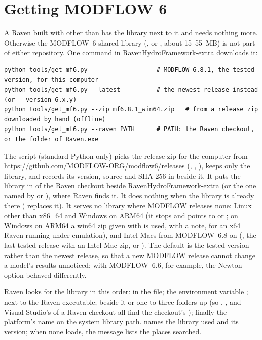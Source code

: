 \section{Getting MODFLOW 6}\label{sec:getmf6}
A Raven built with  other than  has the library next to it and needs nothing more. Otherwise
the MODFLOW~6 shared library (,  or , about 15--55~MB) is not part of
either repository. One command in RavenHydroFramework-extra downloads it:
\begin{lstlisting}
python tools/get_mf6.py                   # MODFLOW 6.8.1, the tested version, for this computer
python tools/get_mf6.py --latest          # the newest release instead (or --version 6.x.y)
python tools/get_mf6.py --zip mf6.8.1_win64.zip   # from a release zip downloaded by hand (offline)
python tools/get_mf6.py --raven PATH      # PATH: the Raven checkout, or the folder of Raven.exe
\end{lstlisting}
The script (standard Python only) picks the release zip for the computer from
\url{https://github.com/MODFLOW-ORG/modflow6/releases} (, ,
), keeps only the library, and records its version, source and SHA-256 in
 beside it. It puts the library in  of the Raven checkout beside
RavenHydroFramework-extra (or the one named by  or ), where Raven finds it. It does nothing
when the library is already there ( replaces it). It serves no library where MODFLOW releases none: Linux
other than x86\_64 and Windows on ARM64 (it stops and points to  or ; on Windows
on ARM64 a win64 zip given with  is used, with a note, for an x64 Raven running under emulation), and Intel
Macs from MODFLOW~6.8 on (, the last tested release with an Intel Mac zip, or ). The
default is the tested version rather than the newest release, so that a new MODFLOW release cannot change a model's
results unnoticed; with MODFLOW~6.6, for example, the Newton option behaved differently.

Raven looks for the library in this order:  in the  file; the environment variable
; next to the Raven executable;  beside it or one to three folders up (so
, ,  and Visual Studio's 
of a Raven checkout all find the checkout's ); finally the platform's name on the system library path.
 names the library used and its version; when none loads, the message lists the places searched.

